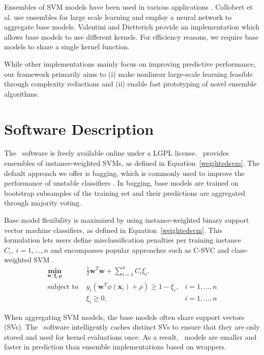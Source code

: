 Ensembles of SVM models have been used in various applications
\citep{Wang20096466,5646323,citeulike:9860864}.
Collobert et al. \citep{Collobert02} use ensembles for large scale learning and employ a neural
network to aggregate base models.
Valentini and Dietterich \citep{Valentini03lowbias} provide an implementation which allows base models to use different kernels.
For efficiency reasons, we require base models to share a single kernel function. 

While other implementations mainly focus on improving predictive performance, our framework
primarily aims to (i) make nonlinear large-scale learning feasible through complexity reductions and (ii) enable fast prototyping of novel ensemble algorithms.

\section{Software Description}
The \esvm\ software is freely available online under a
LGPL license. \esvm\ provides ensembles of
instance-weighted SVMs, as defined in Equation~\eqref{weightedsvm}.
The default approach we offer is bagging, which is commonly used to improve the
performance of unstable classifiers \citep{Breiman:1996:BP:231986.231989}. In
bagging, base models are trained on bootstrap subsamples of the training set
and their predictions are aggregated through majority voting.

Base model flexibility is maximized by using instance-weighted binary support
vector machine classifiers, as defined in Equation~\eqref{weightedsvm}. This formulation lets users define
misclassification penalties per training instance $C_i,\ i=1,\ldots,n$ and
encompasses popular approaches such as C-SVC and class-weighted SVM
\citep{Cortes:1995:SN:218919.218929, osuna1997}.
\begin{align}
\mathbf{\min_{\mathbf{w},\mathbf{\xi},\rho} } \ &
\frac{1}{2}\mathbf{w}^T\mathbf{w}+\sum_{i=1}^n C_i \xi_i,
\label{weightedsvm} \\
\text{subject\ to }  &y_i(\mathbf{w}^T\phi(\mathbf{x}_i)+\rho)\geq 1-\xi_i,
&i=1,\ldots,n \nonumber \\
&\xi_i \geq 0, &i=1,\ldots,n \nonumber  
\end{align}

When aggregating SVM models, the base models often share support
vectors (SVs). The \esvm\ software intelligently caches distinct SVs to ensure
that they are only stored and used for kernel evaluations once. As a result,
\esvm\ models are smaller and faster in prediction than ensemble implementations based on wrappers.

